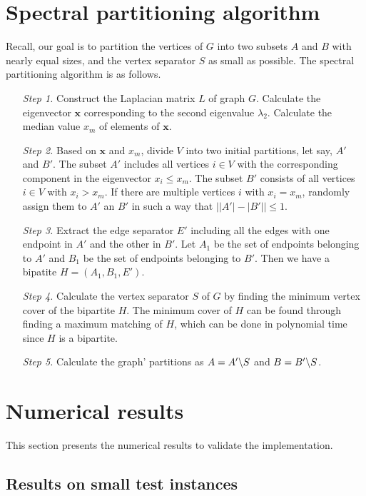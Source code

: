 \documentclass[pdftex, 12pt, a4paper]{article}
\begin{document}
\section{Spectral partitioning algorithm}
\label{sec:algo}
Recall, our goal is to partition the vertices of $G$ into two subsets $A$ and $B$ with nearly equal sizes, and the vertex separator $S$ as small as possible. The spectral partitioning algorithm is as follows.
\begin{itemize}
    \item[\textit{Step 1.}] Construct the Laplacian matrix $L$ of graph $G$. Calculate the eigenvector $\mathbf{x}$ corresponding to the second eigenvalue $\lambda_2$. Calculate the median value $x_m$ of elements of $\mathbf{x}$.
    \item[\textit{Step 2.}] Based on $\mathbf{x}$ and $x_m$, divide $V$ into two initial partitions, let say, $A'$ and $B'$. The subset $A'$ includes all vertices $i \in V$ with the corresponding component in the eigenvector $x_i \leq x_m$. The subset $B'$ consists of all vertices $i\in V$ with $x_i > x_m$. If there are multiple vertices $i$ with $x_i = x_m$, randomly assign them to $A'$ an $B'$ in such a way that $\big||A'| -|B'|\big| \leq 1.$
    \item[\textit{Step 3.}] Extract the edge separator $E'$ including all the edges with one endpoint in $A'$ and the other in $B'$. Let $A_1$ be the set of endpoints belonging to $A'$ and $B_1$ be the set of endpoints belonging to $B'$. Then we have a bipatite $H = (A_1, B_1, E')$.
    \item[\textit{Step 4.}] Calculate the vertex separator $S$ of $G$ by finding the minimum vertex cover of the bipartite $H$. The minimum cover of $H$ can be found through finding a maximum matching of $H$, which can be done in polynomial time since $H$ is a bipartite.
    \item[\textit{Step 5.}] Calculate the graph' partitions as $A = A'\symbol{92}S$ and $B = B'\symbol{92}S$.
\end{itemize}

\section{Numerical results}
This section presents the numerical results to validate the implementation.

\subsection{Results on small test instances}
\end{document}
